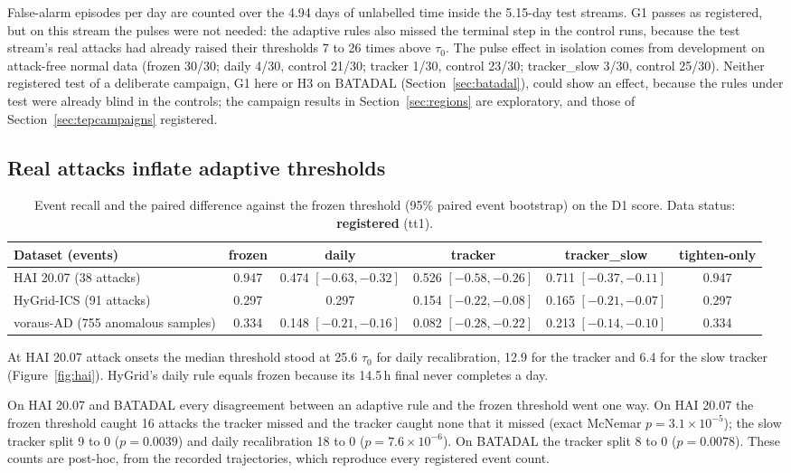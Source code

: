 \documentclass[sigconf]{acmart}
\begin{document}
False-alarm episodes per day are counted over the 4.94 days of unlabelled time inside the 5.15-day
test streams. G1 passes as registered, but on this stream the pulses were not needed: the adaptive
rules also missed the terminal step in the control runs, because the test stream's real attacks had
already raised their thresholds 7 to 26 times above $\tau_0$. The pulse effect in isolation comes
from development on attack-free normal data (frozen 30/30; daily 4/30, control 21/30; tracker 1/30,
control 23/30; tracker\_slow 3/30, control 25/30). Neither registered test of a deliberate campaign, G1
here or H3 on BATADAL (Section~\ref{sec:batadal}), could show an effect, because the rules under test
were already blind in the controls; the campaign results in Section~\ref{sec:regions} are exploratory, and those of
Section~\ref{sec:tepcampaigns} registered.

\subsection{Real attacks inflate adaptive thresholds}
\label{sec:inflate}

\begin{table}[t]
\caption{Event recall and the paired difference against the frozen threshold (95\% paired event
bootstrap) on the D1 score. Data status: \textbf{registered} (tt1).}
\label{tab:recall}
\begin{tabularx}{\textwidth}{@{}Lccccc@{}}
\toprule
Dataset (events) & frozen & daily & tracker & tracker\_slow & tighten-only \\
\midrule
HAI 20.07 (38 attacks) & 0.947 & 0.474 $[-0.63, -0.32]$ & 0.526 $[-0.58, -0.26]$ & 0.711 $[-0.37, -0.11]$ & 0.947 \\
HyGrid-ICS (91 attacks) & 0.297 & 0.297 & 0.154 $[-0.22, -0.08]$ & 0.165 $[-0.21, -0.07]$ & 0.297 \\
voraus-AD (755 anomalous samples) & 0.334 & 0.148 $[-0.21, -0.16]$ & 0.082 $[-0.28, -0.22]$ & 0.213 $[-0.14, -0.10]$ & 0.334 \\
\bottomrule
\end{tabularx}
\end{table}

At HAI 20.07 attack onsets the median threshold stood at 25.6 $\tau_0$ for daily recalibration, 12.9
for the tracker and 6.4 for the slow tracker (Figure~\ref{fig:hai}). HyGrid's daily rule equals frozen because its 14.5\,h
final never completes a day.

On HAI 20.07 and BATADAL every disagreement between an adaptive rule and the frozen threshold went one way. On HAI 20.07 the
frozen threshold caught 16 attacks the tracker missed and the tracker caught none that it missed
(exact McNemar $p = 3.1 \times 10^{-5}$); the slow tracker split 9 to 0 ($p = 0.0039$) and daily
recalibration 18 to 0 ($p = 7.6 \times 10^{-6}$). On BATADAL the tracker split 8 to 0 ($p = 0.0078$).
These counts are post-hoc, from the recorded trajectories, which reproduce every registered event
count.
\end{document}

